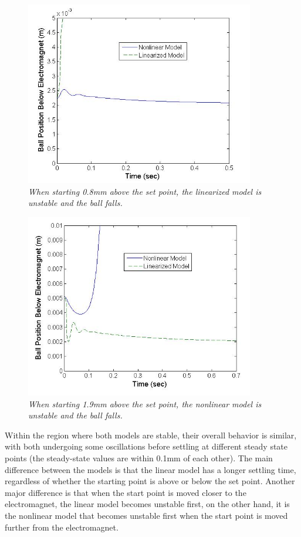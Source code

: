 \documentclass{article}
\theoremstyle{plain}
\theoremstyle{definition}
\theoremstyle{remark}
\begin{document}
\begin{figure}[h!]
\begin{center}
\includegraphics[width = 10cm]{Part2bCloseDisturbance}
\caption{\emph{When starting 0.8mm above the set point, the linearized model is unstable and the ball falls.}}
\label{Q2_b5}
\end{center}
\end{figure}

\begin{figure}[h!]
\begin{center}
\includegraphics[width = 10cm]{Part2bFarDisturbance}
\caption{\emph{When starting 1.9mm above the set point, the nonlinear model is unstable and the ball falls.}}
\label{Q2_b6}
\end{center}
\end{figure}

Within the region where both models are stable, their overall behavior is similar, with both undergoing some oscillations before settling at different steady state points (the steady-state values are within 0.1mm of each other). The main difference between the models is that the linear model has a longer settling time, regardless of whether the starting point is above or below the set point. Another major difference is that when the start point is moved closer to the electromagnet, the linear model becomes unstable first, on the other hand, it is the nonlinear model that becomes unstable first when the start point is moved further from the electromagnet. 
\end{document}
